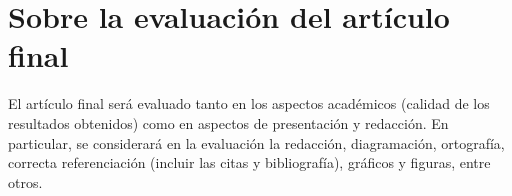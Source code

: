 \documentclass[12pt, letterpaper]{article}
\begin{document}
\section{Sobre la evaluaci\'on del art\'iculo final}
	El art\'iculo final ser\'a evaluado tanto en los aspectos acad\'emicos (calidad de los resultados obtenidos) como en aspectos de presentaci\'on y redacci\'on. En particular, se considerar\'a en la evaluaci\'on la redacci\'on, diagramaci\'on, ortograf\'ia, correcta referenciaci\'on (incluir las citas y bibliograf\'ia), gr\'aficos y figuras, entre otros.
\end{document}
